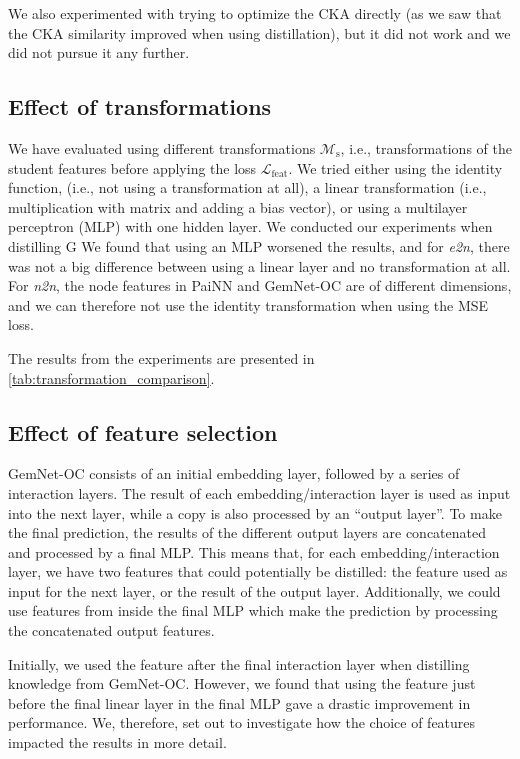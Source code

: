 \documentclass{article}
\newcommand{\loss}{\mathcal{L}}
\begin{document}
We also experimented with trying to optimize the CKA directly (as we saw that the CKA similarity improved when using distillation), but it did not work and we did not pursue it any further. 


\subsection{Effect of transformations} 
\label{ap:transformations}
We have evaluated using different transformations $\mathcal{M}_{\text{s}}$, i.e., transformations of the student features before applying the loss $\loss_{\text{feat}}$. We tried either using the identity function, (i.e., not using a transformation at all), a linear transformation (i.e., multiplication with matrix and adding a bias vector), or using a multilayer perceptron (MLP) with one hidden layer. We conducted our experiments when distilling G We found that using an MLP worsened the results, and for \emph{e2n}, there was not a big difference between using a linear layer and no transformation at all. For \emph{n2n}, the node features in PaiNN and GemNet-OC are of different dimensions, and we can therefore not use the identity transformation when using the MSE loss.

The results from the experiments are presented in \cref{tab:transformation_comparison}.


\subsection{Effect of feature selection}
\label{ap:features}
GemNet-OC consists of an initial embedding layer, followed by a series of interaction layers. The result of each embedding/interaction layer is used as input into the next layer, while a copy is also processed by an ``output layer''. To make the final prediction, the results of the different output layers are concatenated and processed by a final MLP. This means that, for each embedding/interaction layer, we have two features that could potentially be distilled: the feature used as input for the next layer, or the result of the output layer. Additionally, we could use features from inside the final MLP which make the prediction by processing the concatenated output features.

Initially, we used the feature after the final interaction layer when distilling knowledge from GemNet-OC. However, we found that using the feature just before the final linear layer in the final MLP gave a drastic improvement in performance. We, therefore, set out to investigate how the choice of features impacted the results in more detail.
\end{document}
